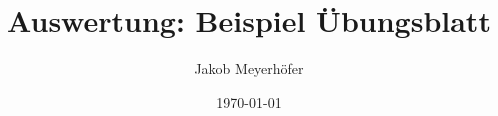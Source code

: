 

\title{Auswertung: Beispiel Übungsblatt} %


\newcommand\bachelor{Bachelorarbeit} %


\author{Jakob Meyerhöfer} %


\date{\today} %


